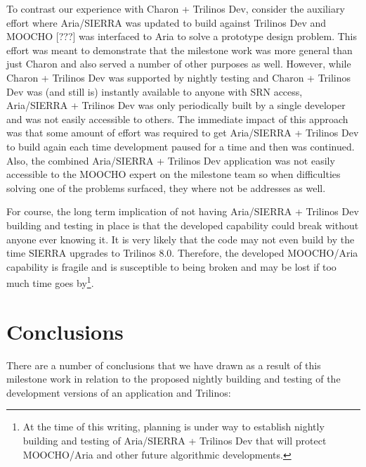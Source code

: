 \documentclass[pdf,ps2pdf,11pt]{SANDreport}
\begin{document}
To contrast our experience with Charon + Trilinos Dev, consider the auxiliary
effort where Aria/SIERRA was updated to build against Trilinos Dev and MOOCHO
[???] was interfaced to Aria to solve a prototype design problem.  This effort
was meant to demonstrate that the milestone work was more general than just
Charon and also served a number of other purposes as well.  However, while
Charon + Trilinos Dev was supported by nightly testing and Charon + Trilinos
Dev was (and still is) instantly available to anyone with SRN access,
Aria/SIERRA + Trilinos Dev was only periodically built by a single developer
and was not easily accessible to others.  The immediate impact of this
approach was that some amount of effort was required to get Aria/SIERRA +
Trilinos Dev to build again each time development paused for a time and then
was continued.  Also, the combined Aria/SIERRA + Trilinos Dev application was
not easily accessible to the MOOCHO expert on the milestone team so when
difficulties solving one of the problems surfaced, they where not be addresses
as well.

For course, the long term implication of not having Aria/SIERRA + Trilinos Dev
building and testing in place is that the developed capability could break
without anyone ever knowing it.  It is very likely that the code may not even
build by the time SIERRA upgrades to Trilinos 8.0.  Therefore, the developed
MOOCHO/Aria capability is fragile and is susceptible to being broken and may be
lost if too much time goes by\footnote{At the time of this writing, planning
is under way to establish nightly building and testing of Aria/SIERRA +
Trilinos Dev that will protect MOOCHO/Aria and other future algorithmic
developments.}.


%
\section{Conclusions}
%

There are a number of conclusions that we have drawn as a result of this
milestone work in relation to the proposed nightly building and testing of the
development versions of an application and Trilinos:
\end{document}
